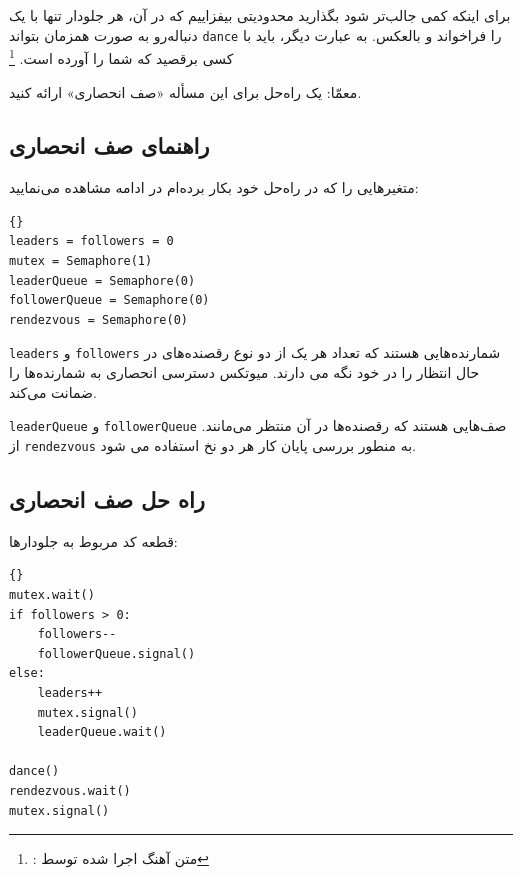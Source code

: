 \documentclass{book}
\newcommand{\clearemptydoublepage}{\newpage\cleardoublepage}
\begin{document}
    برای اینکه کمی جالب‌تر شود بگذارید محدودیتی بیفزاییم که در آن، هر جلودار تنها با یک دنباله‌رو به صورت همزمان بتواند \texttt{dance} را 
    فراخواند و بالعکس. به عبارت دیگر، باید با کسی برقصید که شما را آورده است.%
    \footnote{%
    : متن آهنگ اجرا شده توسط }

    معمّا: یک راه‌حل برای این مسأله «صف انحصاری» ارائه کنید.

\clearemptydoublepage
\subsection {راهنمای صف انحصاری}

    متغیرهایی را که در راه‌حل خود بکار برده‌ام در ادامه مشاهده می‌نمایید:

\begin{latin}
\begin{lstlisting}[title={\rl{راهنمای صف}}]{}
leaders = followers = 0
mutex = Semaphore(1)
leaderQueue = Semaphore(0)
followerQueue = Semaphore(0)
rendezvous = Semaphore(0)
\end{lstlisting}
\end{latin}

    \texttt{leaders} و \texttt{followers}
    شمارنده‌هایی هستند که تعداد هر یک از دو نوع رقصنده‌های در حال انتظار را در خود نگه می دارند. 
    میوتکس دسترسی انحصاری به شمارنده‌ها را ضمانت می‌کند.

    \texttt{leaderQueue} و \texttt{followerQueue}
صف‌هایی هستند که رقصنده‌ها در آن  منتظر می‌مانند. 
    از \texttt{rendezvous}
    به منطور بررسی پایان کار هر دو نخ استفاده می شود. 

\clearemptydoublepage
\subsection {راه حل صف انحصاری}

    قطعه کد مربوط به جلو‌دارها:

\begin{latin}
\begin{lstlisting}[title=\rl{راه حل صف (جلودارها)}]{}
mutex.wait()
if followers > 0:
    followers--
    followerQueue.signal()
else:
    leaders++
    mutex.signal()
    leaderQueue.wait()    

dance()
rendezvous.wait()
mutex.signal()	
\end{lstlisting}
\end{latin}
\end{document}
